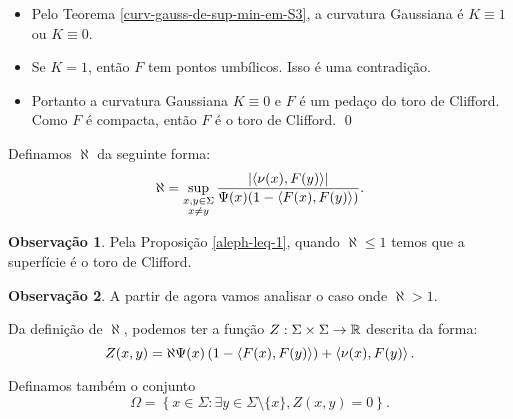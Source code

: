 \documentclass[12pt,a4paper]{beamer}
\theoremstyle{definition}
\newtheorem{observacao}{Observação}
\begin{document}
\begin{frame}
	\begin{itemize}
		
		\item Pelo Teorema \ref{curv-gauss-de-sup-min-em-S3}, a curvatura Gaussiana é $K \equiv 1$ ou $K \equiv 0$.
		
		\item Se $K=1$, então $F$ tem pontos umbílicos. 
		Isso é uma contradição.
		
		\item Portanto a curvatura Gaussiana $K \equiv 0$ e $F$ é um pedaço do toro de Clifford.
		Como $F$ é compacta, então $F$ é o toro de Clifford.
		\qed
	\end{itemize}
\end{frame}

\begin{frame}
	Definamos $\aleph$ da seguinte forma:
		\begin{equation*}
			\aleph = \sup_{\substack{x,y \in \Sigma \\ x \neq y}} \frac{\left| \left\langle \nu(x),F(y) \right\rangle \right|}{\Psi(x) (1-\left\langle F(x),F(y) \right\rangle)}.
		\end{equation*}


	\begin{observacao}
		Pela Proposição \ref{aleph-leq-1}, quando $\aleph \leq 1$ temos que a superfície é o toro de Clifford. 
	\end{observacao}
\end{frame}

\begin{frame}
	\begin{observacao}
		A partir de agora vamos analisar o caso onde $\aleph > 1$.
	\end{observacao}
	
	Da definição de $\aleph$, podemos ter a função $Z: \Sigma \times \Sigma \rightarrow \mathbb R$ descrita da forma:
	\begin{equation*}
		Z(x,y) = \aleph \Psi(x) \left(1 - \left\langle F(x),F(y) \right\rangle \right) + \left\langle \nu(x),F(y) \right\rangle.
	\end{equation*}
	
	Definamos também o conjunto
	\begin{equation*}
	\Omega = \left\{ x \in \Sigma: \exists y \in \Sigma \setminus \{ x \}, Z(x,y)=0 \right\}.
	\end{equation*}
\end{frame}
\end{document}
